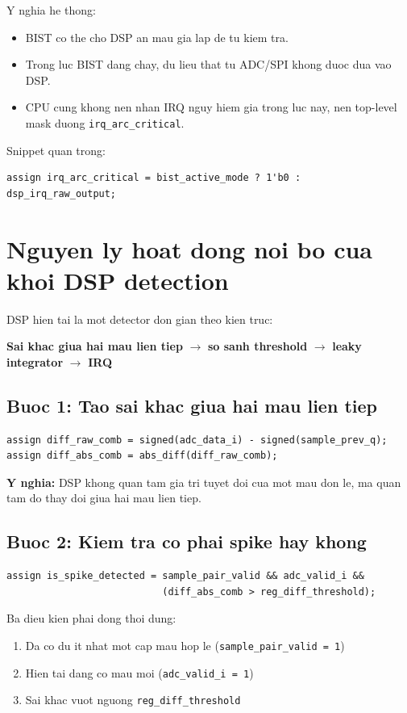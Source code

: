 \documentclass[12pt,a4paper]{article}
\begin{document}
Y nghia he thong:
\begin{itemize}
    \item BIST co the cho DSP an mau gia lap de tu kiem tra.
    \item Trong luc BIST dang chay, du lieu that tu ADC/SPI khong duoc dua vao DSP.
    \item CPU cung khong nen nhan IRQ nguy hiem gia trong luc nay, nen top-level mask duong \texttt{irq\_arc\_critical}.
\end{itemize}

Snippet quan trong:
\begin{lstlisting}[style=svstyle]
assign irq_arc_critical = bist_active_mode ? 1'b0 : dsp_irq_raw_output;
\end{lstlisting}

\section{Nguyen ly hoat dong noi bo cua khoi DSP detection}
DSP hien tai la mot detector don gian theo kien truc:
\begin{center}
\textbf{Sai khac giua hai mau lien tiep} $\rightarrow$ \textbf{so sanh threshold} $\rightarrow$ \textbf{leaky integrator} $\rightarrow$ \textbf{IRQ}
\end{center}

\subsection{Buoc 1: Tao sai khac giua hai mau lien tiep}
\begin{lstlisting}[style=svstyle]
assign diff_raw_comb = signed(adc_data_i) - signed(sample_prev_q);
assign diff_abs_comb = abs_diff(diff_raw_comb);
\end{lstlisting}

\textbf{Y nghia:} DSP khong quan tam gia tri tuyet doi cua mot mau don le, ma quan tam do thay doi giua hai mau lien tiep.

\subsection{Buoc 2: Kiem tra co phai spike hay khong}
\begin{lstlisting}[style=svstyle]
assign is_spike_detected = sample_pair_valid && adc_valid_i &&
                           (diff_abs_comb > reg_diff_threshold);
\end{lstlisting}

Ba dieu kien phai dong thoi dung:
\begin{enumerate}[label=\arabic*.]
    \item Da co du it nhat mot cap mau hop le (\texttt{sample\_pair\_valid = 1})
    \item Hien tai dang co mau moi (\texttt{adc\_valid\_i = 1})
    \item Sai khac vuot nguong \texttt{reg\_diff\_threshold}
\end{enumerate}
\end{document}
